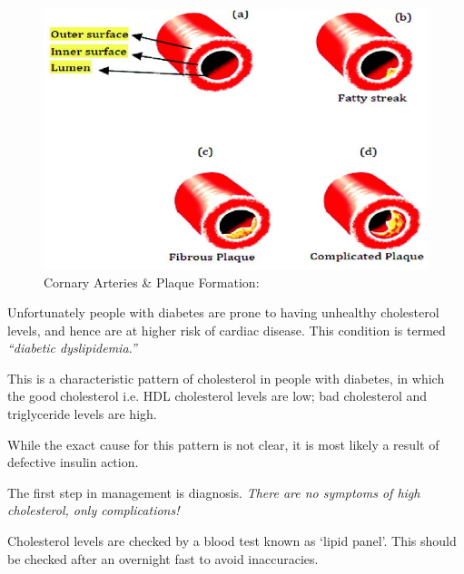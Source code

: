 \begin{figure}
\includegraphics{images/044.jpg}
\caption{Cornary Arteries \& Plaque Formation:}
\end{figure}

Unfortunately people with diabetes are prone to having unhealthy cholesterol levels, and hence are at higher risk of cardiac disease. This condition is termed \textit{“diabetic dyslipidemia.”}


This is a characteristic pattern of cholesterol in people with diabetes, in which the good cholesterol i.e. HDL cholesterol levels are low; bad cholesterol and triglyceride levels are high.

While the exact cause for this pattern is not clear, it is most likely a result of defective insulin action.



The first step in management is diagnosis. \textit{There are no symptoms of high cholesterol, only complications!}

Cholesterol levels are checked by a blood test known as ‘lipid panel’. This should be checked after an overnight fast to avoid inaccuracies.


